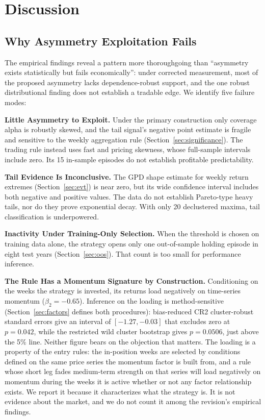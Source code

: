 \documentclass[11pt]{article}
\begin{document}
\section{Discussion}

\subsection{Why Asymmetry Exploitation Fails}

The empirical findings reveal a pattern more thoroughgoing than ``asymmetry exists statistically but fails economically'': under corrected measurement, most of the proposed asymmetry lacks dependence-robust support, and the one robust distributional finding does not establish a tradable edge. We identify five failure modes:

\textbf{Little Asymmetry to Exploit.} Under the primary construction only coverage alpha is robustly skewed, and the tail signal's negative point estimate is fragile and sensitive to the weekly aggregation rule (Section~\ref{sec:significance}). The trading rule instead uses fast and pricing skewness, whose full-sample intervals include zero. Its 15 in-sample episodes do not establish profitable predictability.

\textbf{Tail Evidence Is Inconclusive.} The GPD shape estimate for weekly return extremes (Section~\ref{sec:evt}) is near zero, but its wide confidence interval includes both negative and positive values. The data do not establish Pareto-type heavy tails, nor do they prove exponential decay. With only 20 declustered maxima, tail classification is underpowered.

\textbf{Inactivity Under Training-Only Selection.} When the threshold is chosen on training data alone, the strategy opens only one out-of-sample holding episode in eight test years (Section~\ref{sec:oos}). That count is too small for performance inference.

\textbf{The Rule Has a Momentum Signature by Construction.} Conditioning on the weeks the strategy is invested, its returns load negatively on time-series momentum ($\beta_2 = -0.65$). Inference on the loading is method-sensitive (Section~\ref{sec:factors} defines both procedures): bias-reduced CR2 cluster-robust standard errors give an interval of $[-1.27, -0.03]$ that excludes zero at $p = 0.042$, while the restricted wild cluster bootstrap gives $p = 0.0506$, just above the 5\% line. Neither figure bears on the objection that matters. The loading is a property of the entry rules: the in-position weeks are selected by conditions defined on the same price series the momentum factor is built from, and a rule whose short leg fades medium-term strength on that series will load negatively on momentum during the weeks it is active whether or not any factor relationship exists. We report it because it characterizes what the strategy is. It is not evidence about the market, and we do not count it among the revision's empirical findings.
\end{document}
